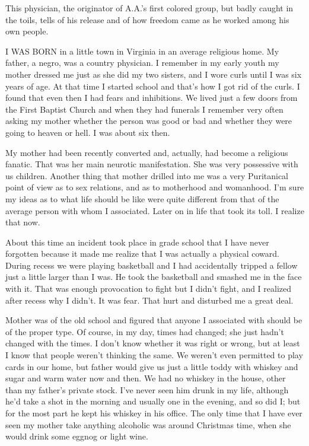

\bbChapterPreamble




\begin{biblechapter}
    This physician, 
    the originator of A.A.’s first colored group, 
    but badly caught in the toils, 
    tells of his release 
    and of how freedom came as he worked among his own people.
\end{biblechapter}


\begin{biblechapter}
    I WAS BORN in a little town in Virginia 
        in an average religious home.
\verse My father, a negro, was a country physician.
\verse I remember in my early youth my mother dressed me 
    just as she did my two sisters, 
    and I wore curls until I was six years of age.
\verse At that time I started school 
    and that’s how I got rid of the curls.
\verse I found that even then I had fears and inhibitions.
\verse We lived just a few doors from the First Baptist Church 
    and when they had funerals 
    I remember very often asking my mother 
    whether the person was good or bad 
    and whether they were going to heaven or hell.
\verse I was about six then.

\verse My mother had been recently converted and, actually, had become a religious fanatic. That was her main neurotic manifestation. She was very possessive with us children. Another thing that mother drilled into me was a very Puritanical point of view as to sex relations, and as to motherhood and womanhood. I’m sure my ideas as to what life should be like were quite different from that of the average person with whom I associated. Later on in life that took its toll. I realize that now.

About this time an incident took place in grade school that I have never forgotten because it made me realize that I was actually a physical coward. During recess we were playing basketball and I had accidentally tripped a fellow just a little larger than I was. He took the basketball and smashed me in the face with it. That was enough provocation to fight but I didn’t fight, and I realized after recess why I didn’t. It was fear. That hurt and disturbed me a great deal.

Mother was of the old school and figured that anyone I associated with should be of the proper type. Of course, in my day, times had changed; she just hadn’t changed with the times. I don’t know whether it was right or wrong, but at least I know that people weren’t thinking the same. We weren’t even permitted to play cards in our home, but father would give us just a little toddy with whiskey and sugar and warm water now and then. We had no whiskey in the house, other than my father’s private stock. I’ve never seen him drunk in my life, although he’d take a shot in the morning and usually one in the evening, and so did I; but for the most part he kept his whiskey in his office. The only time that I have ever seen my mother take anything alcoholic was around Christmas time, when she would drink some eggnog or light wine.


\end{biblechapter}
